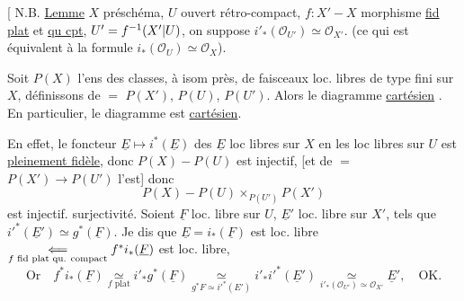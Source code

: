 [ N.B. \uline{Lemme} $X$ préschéma, $U$ ouvert rétro-compact, $f:X'\mathbin{-}X$ morphisme \uline{fid plat} et \uline{qu cpt}, $U'=f^{-1}(X'|U)$, on suppose $\boxed{i'_*(\mathcal O_{U'})\simeq\mathcal O_{X'}}$. (ce qui est équivalent à la formule $\boxed{i_*(\mathcal O_U)\simeq\mathcal O_X}$).


Soit $P(X)$ l'ens des classes, à isom près, de faisceaux loc. libres de type fini sur $X$, définissons de $=$ $P(X')$, $P(U)$, $P(U')$. Alors le diagramme
 \uline{cartésien} . En particulier, le diagramme
est \uline{cartésien}.


En effet,  le foncteur $\underline E\longmapsto i^*(\underline E)$ des $\underline E$ loc libres sur $X$ en les  loc libres sur $U$ est \uline{pleinement fidèle}, donc $P(X)\mathbin{-}P(U)$ est injectif, [et de $=$ $P(X')\longrightarrow P(U')$ l'est] donc
\[
 P(X)\mathbin{-}P(U)\mathop{\times}_{P(U')}P(X')
\]
est injectif.   surjectivité. Soient $\underline F$ loc. libre sur $U$, $\underline E'$ loc. libre sur $X'$, tels que $i'^*(\underline E')\simeq g^*(\underline F)$. Je dis que $\underline E=i_*(\underline F)$ est loc. libre $\underset{\text{$f$ fid plat qu. compact}}{\Longleftarrow} f^*i_*(\underline F)$ est loc. libre,
\[
 \text{Or}\quad f^*i_*(\underline F)\underset{f\text{ plat}}{\simeq}i'_*g^*(\underline F)\underset{g^*F\simeq i'^*(E')}{\simeq}i'_*i'^*(\underline E')\underset{i'_*(\mathcal O_{U'})\simeq\mathcal O_{X'}}{\simeq}\underline E',\quad \text{OK.}
\]
